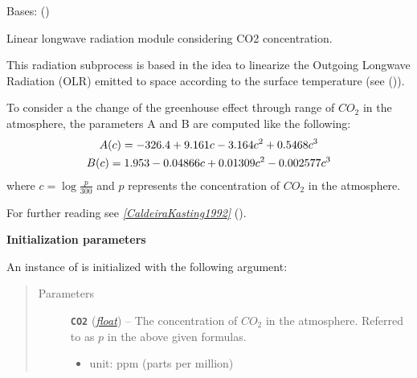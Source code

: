 \documentclass[a4paper,10pt,english]{sphinxmanual}
\begin{document}

\begin{fulllineitems}
\label{api/climlab.radiation:climlab.radiation.AplusBT.AplusBT_CO2}
Bases: {\hyperref[api/climlab.process:climlab.process.energy_budget.EnergyBudget]{\emph{}}} ()

Linear longwave radiation module considering CO2 concentration.

This radiation subprocess is based in the idea to linearize the Outgoing 
Longwave Radiation (OLR) emitted to space according to the surface temperature
(see {\hyperref[api/climlab.radiation:climlab.radiation.AplusBT.AplusBT]{\emph{}}} ()).

To consider a the change of the greenhouse effect through range of
\(CO_2\) in the atmosphere, the parameters A and B are computed like
the following:
\begin{gather}
\begin{split}A(c) = -326.4 + 9.161 c - 3.164 c^2 + 0.5468 c^3            \end{split}\notag\\\begin{split}B(c) =  1.953 - 0.04866 c + 0.01309 c^2 - 0.002577 c^3\end{split}\notag
\end{gather}
where \(c=\log \frac{p}{300}\) and \(p\) represents 
the concentration of \(CO_2\) in the atmosphere.

For further reading see \label{api/climlab.radiation:id1}{\hyperref[references:caldeirakasting1992]{\emph{{[}CaldeiraKasting1992{]}}}} ().

\textbf{Initialization parameters}

An instance of  is initialized with the following 
argument:
\begin{quote}\begin{description}
\item[{Parameters}] \leavevmode
\textbf{\texttt{CO2}} (\href{http://docs.python.org/2.7/library/functions.html\#float}{\emph{float}}) -- 
The concentration of \(CO_2\) in the atmosphere.
Referred to as \(p\) in the above given formulas.
\begin{itemize}
\item {} 
unit: \(\textrm{ppm}\) (parts per million)


\end{itemize}
\end{description}
\end{quote}
\end{fulllineitems}
\end{document}

